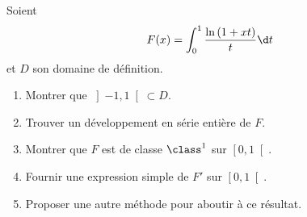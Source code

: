 \begin{enonce}
\begin{exercise}[ID={RMS132 E1174},subtitle={CCINP PSI 2021},tags={}]
Soient
\begin{equation*}
  F(x) = \int_0^1 \frac{\ln\left( 1+xt \right)}{t} \d t
\end{equation*}
et $D$ son domaine de définition.
\begin{enumerate}
  \item Montrer que $\left]-1,1\right[\subset D$.
  \item Trouver un développement en série entière de $F$.
  \item Montrer que $F$ est de classe $\class^1$ sur $\left[0,1\right[$.
  \item Fournir une expression simple de $F'$ sur $\left[0,1\right[$.
  \item Proposer une autre méthode pour aboutir à ce résultat.
\end{enumerate}
\end{exercise}
\begin{solution}
\end{solution}
\end{enonce}
